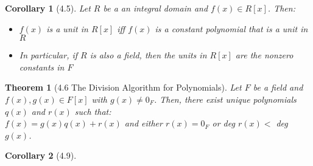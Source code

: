 \documentclass{article}
\theoremstyle{break}
\newtheorem*{theorem*}{Theorem}
\newtheorem*{corollary*}{Corollary}
\begin{document}
\begin{corollary*}[4.5]
  Let $R$ be a an integral domain and $f(x) \in R[x]$. Then:
  \begin{itemize}
    \item $f(x)$ is a unit in $R[x]$ iff $f(x)$ is a constant polynomial that
    is a unit in $R$
    \item In particular, if $R$ is also a field, then the units in $R[x]$ are
    the nonzero constants in $F$
  \end{itemize}
\end{corollary*}

\begin{theorem*}[4.6 The Division Algorithm for Polynomials]
  Let $F$ be a field and $f(x), g(x) \in F[x]$ with $g(x) \neq 0_F$. Then,
  there exist unique polynomials $q(x)$ and $r(x)$ such that: \\
  $f(x) = g(x)q(x) + r(x)$ and either $r(x) = 0_F$ or deg $r(x) <$ deg $g(x)$. 
\end{theorem*}

\begin{corollary*}[4.9]
\end{corollary*}

\end{document}
